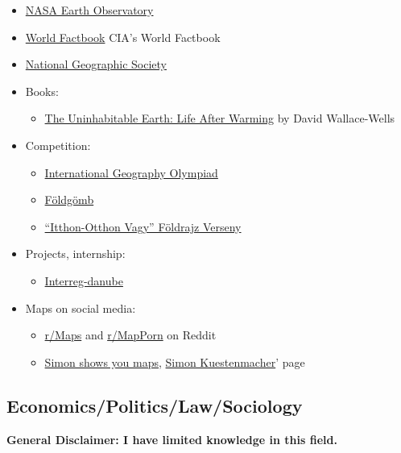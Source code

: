 \documentclass{article}
\begin{document}
\begin{itemize}
    \item \href{https://earthobservatory.nasa.gov/}{NASA Earth Observatory}
    \item \href{https://www.cia.gov/the-world-factbook/}{World Factbook} CIA’s World Factbook
    \item \href{https://www.nationalgeographic.org/}{National Geographic Society}
    \item Books:
    \begin{itemize}
        \item \href{https://www.goodreads.com/tr/book/show/41552709-the-uninhabitable-earth}{The Uninhabitable Earth: Life After Warming} by David Wallace-Wells
    \end{itemize}
    \item Competition:
    \begin{itemize}
        \item \href{http://www.geoolympiad.org/}{International Geography Olympiad}
        \item \href{https://afoldgomb.hu/foldrajzverseny}{Földgömb}
        \item \href{http://eotvos-tata.edu.hu/versenyek/foldrajz/itthonotthon_index.htm}{``Itthon-Otthon Vagy'' Földrajz Verseny}
    \end{itemize}
    \item Projects, internship:
    \begin{itemize}
        \item \href{http://www.interreg-danube.eu/approved-projects/tid-y-up/partners}{Interreg-danube}
    \end{itemize}
    \item Maps on social media:
    \begin{itemize}
        \item \href{https://www.reddit.com/r/Maps/}{r/Maps} and \href{https://www.reddit.com/r/MapPorn/}{r/MapPorn} on Reddit
        \item \href{https://www.facebook.com/SimonGerman600}{Simon shows you maps}, \href{https://twitter.com/simongerman600}{Simon Kuestenmacher}' page
    \end{itemize}
\end{itemize}

\subsection{Economics/Politics/Law/Sociology}
\textbf{General Disclaimer: I have limited knowledge in this field.}
\end{document}
